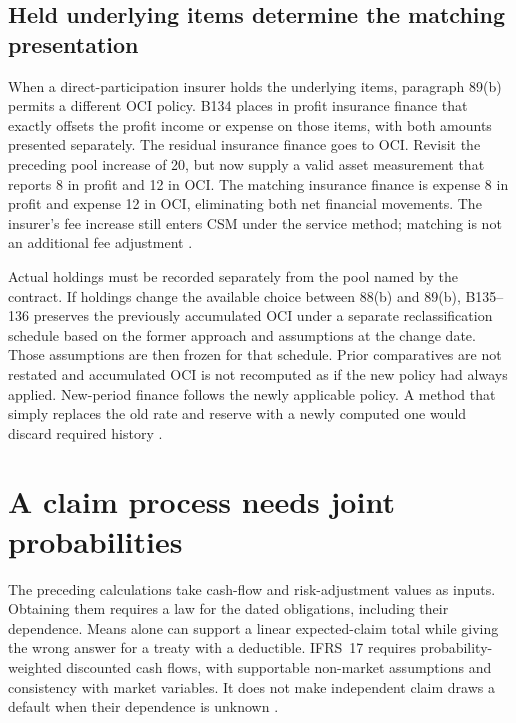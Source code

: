 \subsection{Held underlying items determine the matching presentation}

When a direct-participation insurer holds the underlying items, paragraph
89(b) permits a different OCI policy. B134 places in profit insurance
finance that exactly offsets the profit income or expense on those items,
with both amounts presented separately. The residual insurance finance
goes to OCI. Revisit the preceding pool increase of 20, but now supply a
valid asset measurement that reports 8 in profit and 12 in OCI. The matching
insurance finance is expense 8 in profit and expense 12 in OCI, eliminating
both net financial movements. The insurer's fee increase still enters CSM
under the service method; matching is not an additional fee adjustment
\citep[IFRS~17.87A--90,B134]{eu20231803}.

Actual holdings must be recorded separately from the pool named by the
contract. If holdings change the available choice between 88(b) and 89(b),
B135--136 preserves the previously accumulated OCI under a separate
reclassification schedule based on the former approach and assumptions at
the change date. Those assumptions are then frozen for that schedule.
Prior comparatives are not restated and accumulated OCI is not recomputed
as if the new policy had always applied. New-period finance follows the
newly applicable policy. A method that simply replaces the old rate and
reserve with a newly computed one would discard required history
\citep[IFRS~17.B135--136]{eu20231803}.



\section{A claim process needs joint probabilities}
\label{sec:insurance-joint-process}

The preceding calculations take cash-flow and risk-adjustment values as
inputs. Obtaining them requires a law for the dated obligations, including
their dependence. Means alone can support a linear expected-claim total
while giving the wrong answer for a treaty with a deductible. IFRS~17
requires probability-weighted discounted cash flows, with supportable
non-market assumptions and consistency with market variables. It does not
make independent claim draws a default when their dependence is unknown
\citep[IFRS~17.B37--41,B49--55]{eu20231803}.

